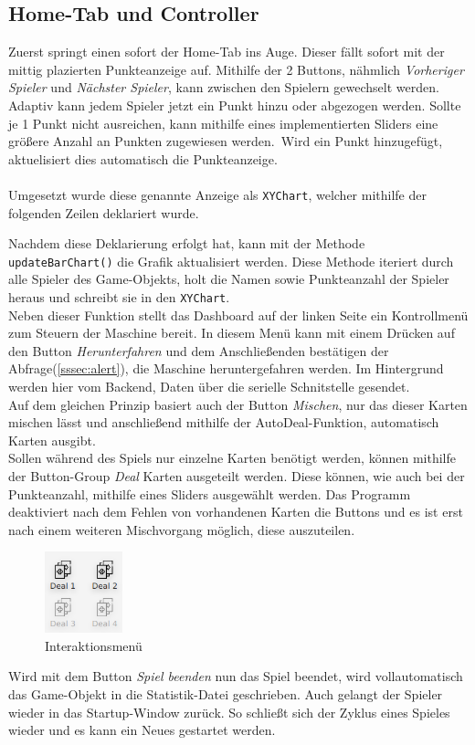 \subsection{Home-Tab und Controller}
Zuerst springt einen sofort der Home-Tab ins Auge.
Dieser fällt sofort mit der mittig plazierten Punkteanzeige auf.
Mithilfe der 2 Buttons, nähmlich \textit{Vorheriger Spieler} und \textit{Nächster Spieler}, kann zwischen den Spielern gewechselt werden.
Adaptiv kann jedem Spieler jetzt ein Punkt hinzu oder abgezogen werden.
Sollte je 1 Punkt nicht ausreichen, kann mithilfe eines implementierten Sliders eine größere Anzahl an Punkten zugewiesen werden.\
Wird ein Punkt hinzugefügt, aktuelisiert dies automatisch die Punkteanzeige.\\\\
Umgesetzt wurde diese genannte Anzeige als \lstinline[style=java]{XYChart}, welcher mithilfe der folgenden Zeilen deklariert wurde.

Nachdem diese Deklarierung erfolgt hat, kann mit der Methode \lstinline[style=java]{updateBarChart()} die Grafik aktualisiert werden.
Diese Methode iteriert durch alle Spieler des Game-Objekts, holt die Namen sowie Punkteanzahl der Spieler heraus und schreibt sie in den \lstinline[style=java]{XYChart}.\\
Neben dieser Funktion stellt das Dashboard auf der linken Seite ein Kontrollmenü zum Steuern der Maschine bereit.
In diesem Menü kann mit einem Drücken auf den Button \textit{Herunterfahren} und dem Anschließenden bestätigen der Abfrage(\autoref{sssec:alert}), die Maschine heruntergefahren werden.
Im Hintergrund werden hier vom Backend, Daten über die serielle Schnitstelle gesendet.\\
Auf dem gleichen Prinzip basiert auch der Button \textit{Mischen}, nur das dieser Karten mischen lässt und anschließend mithilfe der AutoDeal-Funktion, automatisch Karten ausgibt.\\
Sollen während des Spiels nur einzelne Karten benötigt werden, können mithilfe der Button-Group \textit{Deal} Karten ausgeteilt werden.
Diese können, wie auch bei der Punkteanzahl, mithilfe eines Sliders ausgewählt werden.
Das Programm deaktiviert nach dem Fehlen von vorhandenen Karten die Buttons und es ist erst nach einem weiteren Mischvorgang möglich, diese auszuteilen.\\
\begin{figure}[H]
\centering
\includegraphics[width=0.2\textwidth]{fig/ainf/Interface.png}
\caption{Interaktionsmenü}
\label{interface}
\end{figure}
Wird mit dem Button \textit{Spiel beenden} nun das Spiel beendet, wird vollautomatisch das Game-Objekt in die Statistik-Datei geschrieben.
Auch gelangt der Spieler wieder in das Startup-Window zurück.
So schließt sich der Zyklus eines Spieles wieder und es kann ein Neues gestartet werden.
